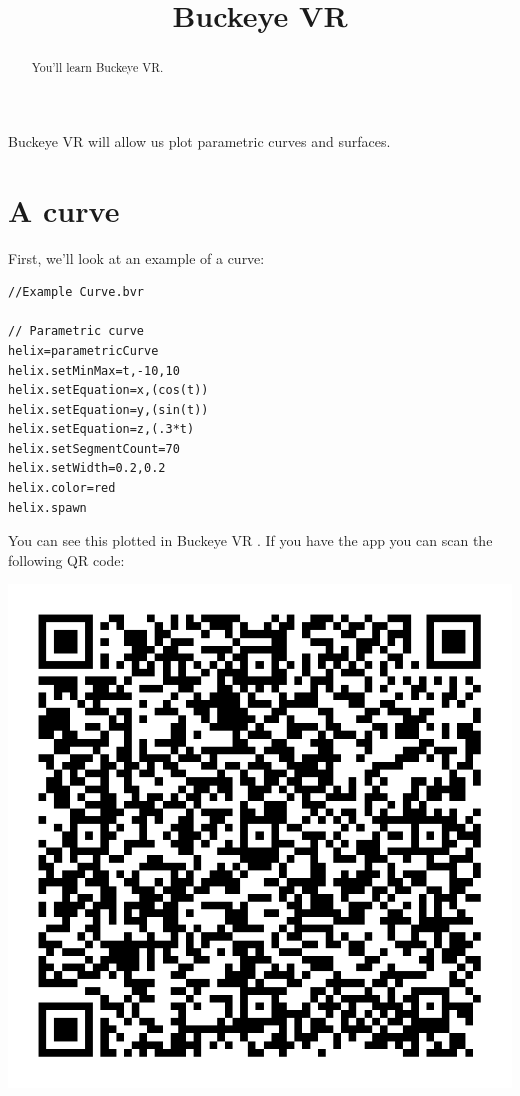 \documentclass{ximera}
\title{Buckeye VR}
\begin{document}
\begin{abstract}
  You'll learn Buckeye VR.
\end{abstract}
\maketitle

Buckeye VR will allow us plot parametric curves and surfaces.

\section{A curve}

First, we'll look at an example of a curve:

\begin{verbatim}
//Example Curve.bvr

// Parametric curve
helix=parametricCurve
helix.setMinMax=t,-10,10
helix.setEquation=x,(cos(t))
helix.setEquation=y,(sin(t))
helix.setEquation=z,(.3*t)
helix.setSegmentCount=70
helix.setWidth=0.2,0.2
helix.color=red
helix.spawn
\end{verbatim}

You can see this plotted in Buckeye VR
.
If you have the app you can scan the following QR code:
\begin{image}
\includegraphics{bvrQR1.png}  
\end{image}
\end{document}
